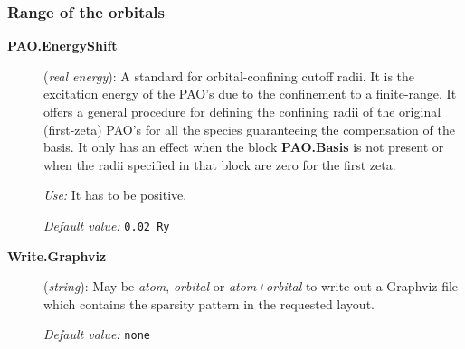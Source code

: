 \subsubsection{Range of the orbitals}

\begin{description}
\item[\textbf{PAO.EnergyShift}] (\textit{real energy}): A standard for
orbital-confining cutoff radii. It is the excitation energy
of the PAO's due to the confinement to a finite-range. It offers a
general procedure for defining the confining radii of the original
(first-zeta) PAO's for all the species guaranteeing the compensation
of the basis. It only has an effect when the block
\textbf{PAO.Basis} is not present or when the radii
specified in that block are zero for the first zeta.

\textit{Use:} It has to be positive.

\textit{Default value:} \texttt{0.02 Ry}

\item[\textbf{Write.Graphviz}] (\textit{string}): %
May be \emph{atom}, \emph{orbital} or \emph{atom+orbital} to write 
out a Graphviz file which contains the sparsity pattern in the requested
layout.

\textit{Default value:} \texttt{none}

\end{description}

